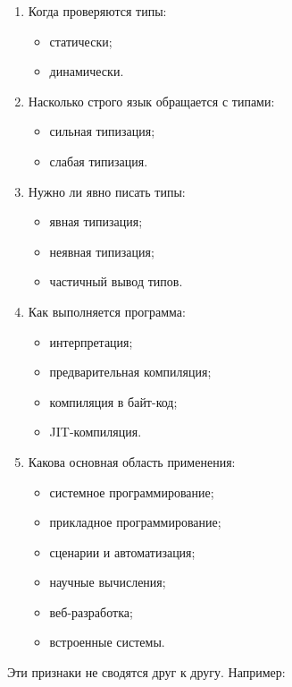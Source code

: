 \documentclass[12pt,a4paper]{article}
\begin{document}
\begin{enumerate}
    \item Когда проверяются типы:
    \begin{itemize}
        \item статически;
        \item динамически.
    \end{itemize}

    \item Насколько строго язык обращается с типами:
    \begin{itemize}
        \item сильная типизация;
        \item слабая типизация.
    \end{itemize}

    \item Нужно ли явно писать типы:
    \begin{itemize}
        \item явная типизация;
        \item неявная типизация;
        \item частичный вывод типов.
    \end{itemize}

    \item Как выполняется программа:
    \begin{itemize}
        \item интерпретация;
        \item предварительная компиляция;
        \item компиляция в байт-код;
        \item JIT-компиляция.
    \end{itemize}

    \item Какова основная область применения:
    \begin{itemize}
        \item системное программирование;
        \item прикладное программирование;
        \item сценарии и автоматизация;
        \item научные вычисления;
        \item веб-разработка;
        \item встроенные системы.
    \end{itemize}
\end{enumerate}

Эти признаки не сводятся друг к другу. Например:
\end{document}
